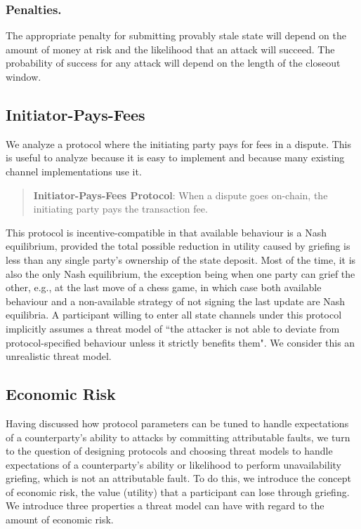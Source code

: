 \documentclass[prb,floatfix,reprint,nofootinbib,amsmath,amssymb,epsfig,pre,floats,letterpaper,groupedaffiliation,tightenlines,allcolors=blue,11pt]{revtex4}
\theoremstyle{definition}
\theoremstyle{definition}
\theoremstyle{definition}
\begin{document}
\subsubsection{Penalties.} The appropriate penalty for submitting provably stale state will depend on the amount of money at risk and the likelihood that an attack will succeed. The probability of success for any attack will depend on the length of the closeout window.

\subsection{Initiator-Pays-Fees}

We analyze a protocol where the initiating party pays for fees in a dispute. This is useful to analyze because it is easy to implement and because many existing channel implementations \cite{sprites, perun} use it.

\begin{quote}
\textbf{Initiator-Pays-Fees Protocol}: When a dispute goes on-chain, the initiating party pays the transaction fee.
\end{quote}

This protocol is incentive-compatible in that available behaviour is a Nash equilibrium, provided the total possible reduction in utility caused by griefing is less than any single party's ownership of the state deposit. Most of the time, it is also the only Nash equilibrium, the exception being when one party can grief the other, e.g., at the last move of a chess game, in which case both available behaviour and a non-available strategy of not signing the last update are Nash equilibria. A participant willing to enter all state channels under this protocol implicitly assumes a threat model of ``the attacker is not able to deviate from protocol-specified behaviour unless it strictly benefits them". We consider this an unrealistic threat model.

\subsection{Economic Risk}

Having discussed how protocol parameters can be tuned to handle expectations of a counterparty's ability to attacks by committing attributable faults, we turn to the question of designing protocols and choosing threat models to handle expectations of a counterparty's ability or likelihood to perform unavailability griefing, which is not an attributable fault. To do this, we introduce the concept of economic risk, the value (utility) that a participant can lose through griefing. We introduce three properties a threat model can have with regard to the amount of economic risk.
\end{document}
